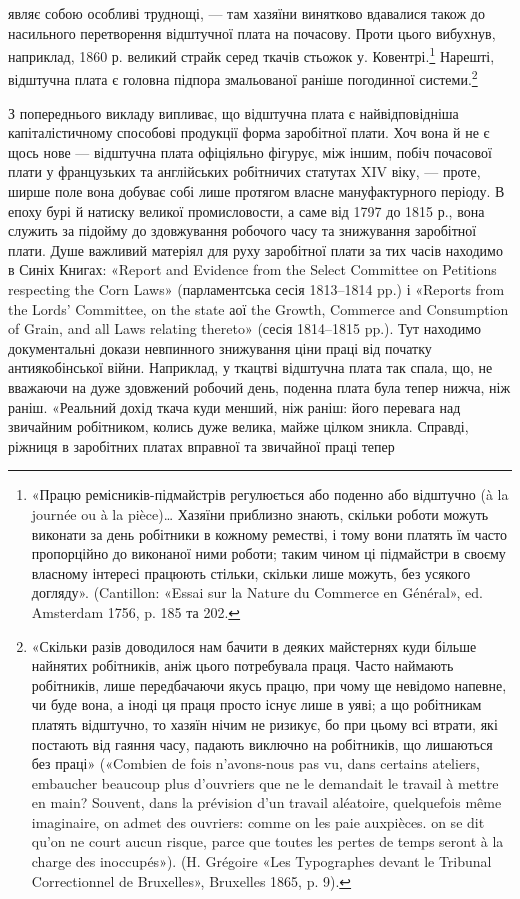 являє собою особливі труднощі, — там хазяїни винятково вдавалися
також до насильного перетворення відштучної плата на почасову.
Проти цього вибухнув, наприклад, 1860 р. великий страйк
серед ткачів стьожок у. Ковентрі.\footnote{
«Працю ремісників-підмайстрів регулюється або поденно або
відштучно (à la journée ou à la pièce)\dots{} Хазяїни приблизно знають,
скільки роботи можуть виконати за день робітники в кожному реместві,
і тому вони платять їм часто пропорційно до виконаної ними роботи;
таким чином ці підмайстри в своєму власному інтересі працюють стільки,
скільки лише можуть, без усякого догляду». (Cantillon: «Essai sur la
Nature du Commerce en Général», ed. Amsterdam 1756, p. 185 та 202.
} Нарешті, відштучна плата
є головна підпора змальованої раніше погодинної системи.\footnote{
«Скільки разів доводилося нам бачити в деяких майстернях куди
більше найнятих робітників, аніж цього потребувала праця. Часто наймають
робітників, лише передбачаючи якусь працю, при чому ще невідомо
напевне, чи буде вона, а іноді ця праця просто існує лише в уяві;
а що робітникам платять відштучно, то хазяїн нічим не ризикує, бо при
цьому всі втрати, які постають від гаяння часу, падають виключно на
робітників, що лишаються без праці» («Combien de fois n’avons-nous
pas vu, dans certains ateliers, embaucher beaucoup plus d’ouvriers que
ne le demandait le travail à mettre en main? Souvent, dans la prévision
d’un travail aléatoire, quelquefois même imaginaire, on admet des ouvriers:
comme on les paie auxpièces. on se dit qu’on ne court aucun risque, parce
que toutes les pertes de temps seront à la charge des inoccupés»). (H. Grégoire
«Les Typographes devant le Tribunal Correctionnel de Bruxelles»,
Bruxelles 1865, p. 9).
}

З попереднього викладу випливає, що відштучна плата є найвідповідніша
капіталістичному способові продукції форма заробітної
плати. Хоч вона й не є щось нове — відштучна плата офіціяльно
фігурує, між іншим, побіч почасової плати у французьких
та англійських робітничих статутах XIV віку, — проте, ширше
поле вона добуває собі лише протягом власне мануфактурного
періоду. В епоху бурі й натиску великої промисловости, а саме
від 1797 до 1815 р., вона служить за підойму до здовжування
робочого часу та знижування заробітної плати. Душе важливий
матеріял для руху заробітної плати за тих часів находимо в
Синіх Книгах: «Report and Evidence from the Select Committee
on Petitions respecting the Corn Laws» (парламентська сесія
1813--1814 pp.) і «Reports from the Lords’ Committee, on the
state аої the Growth, Commerce and Consumption of Grain, and
all Laws relating thereto» (сесія 1814--1815 pp.). Тут находимо
документальні докази невпинного знижування ціни праці від
початку антиякобінської війни. Наприклад, у ткацтві відштучна
плата так спала, що, не вважаючи на дуже здовжений робочий
день, поденна плата була тепер нижча, ніж раніш. «Реальний дохід
ткача куди менший, ніж раніш: його перевага над звичайним
робітником, колись дуже велика, майже цілком зникла. Справді,
ріжниця в заробітних платах вправної та звичайної праці тепер

